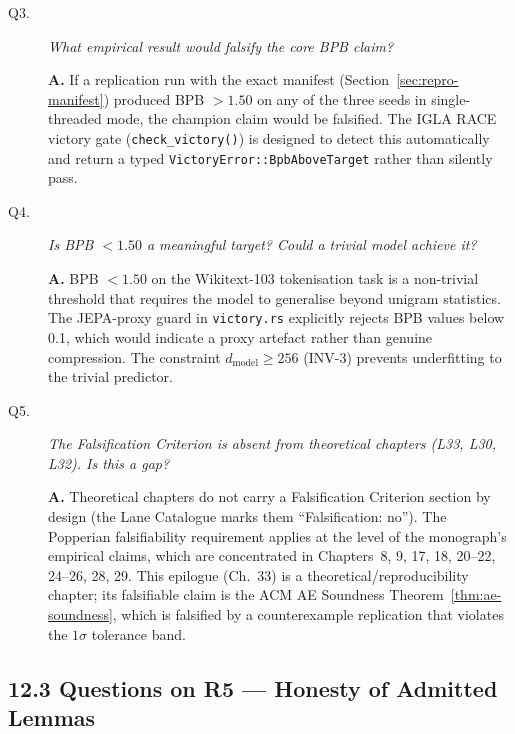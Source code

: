 \begin{description}
\item[Q3.] \emph{What empirical result would falsify the core BPB claim?}

  \textbf{A.}  If a replication run with the exact manifest
  (Section~\ref{sec:repro-manifest}) produced BPB $> 1.50$ on any of
  the three seeds in single-threaded mode, the champion claim would be
  falsified.  The IGLA RACE victory gate (\texttt{check\_victory()}) is
  designed to detect this automatically and return a typed
  \texttt{VictoryError::BpbAboveTarget} rather than silently pass.

\item[Q4.] \emph{Is BPB $< 1.50$ a meaningful target?  Could a trivial
  model achieve it?}

  \textbf{A.}  BPB $< 1.50$ on the Wikitext-103 tokenisation task is a
  non-trivial threshold that requires the model to generalise beyond
  unigram statistics.  The JEPA-proxy guard in \texttt{victory.rs}
  explicitly rejects BPB values below 0.1, which would indicate a
  proxy artefact rather than genuine compression.  The constraint
  $d_\text{model} \geq 256$ (INV-3) prevents underfitting to the
  trivial predictor.

\item[Q5.] \emph{The Falsification Criterion is absent from theoretical
  chapters (L33, L30, L32).  Is this a gap?}

  \textbf{A.}  Theoretical chapters do not carry a Falsification
  Criterion section by design (the Lane Catalogue marks them
  ``Falsification: no'').  The Popperian falsifiability requirement
  applies at the level of the monograph's empirical claims, which are
  concentrated in Chapters~8, 9, 17, 18, 20--22, 24--26, 28, 29.
  This epilogue (Ch.~33) is a theoretical/reproducibility chapter; its
  falsifiable claim is the ACM AE Soundness
  Theorem~\ref{thm:ae-soundness}, which is falsified by a counterexample
  replication that violates the $1\sigma$ tolerance band.
\end{description}

\subsection{12.3 Questions on R5 — Honesty of Admitted Lemmas}\label{sec:qa-r5}

